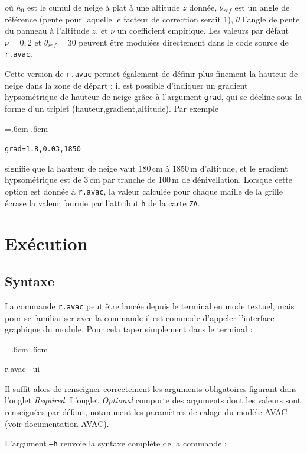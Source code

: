 \documentclass[12pt,oneside]{paper}
\newenvironment{code}{%
\vspace{2mm}%
\hangindent=.6cm%
\parindent.6cm%
\ttfamily%
\color{gris.3}%
}{
\vspace{2mm}%
}
\begin{document}
où $h_0$ est le cumul de neige à plat à une altitude $z$ donnée, $\theta_{ref}$ est un angle de référence (pente pour laquelle le facteur de correction serait 1),   $\theta$ l'angle de pente du panneau à l'altitude $z$, et $\nu$ un coefficient empirique. Les valeurs par défaut $\nu=0,2$ et $\theta_{ref}=30$\degres{} peuvent être modulées directement dans le code source de \verb+r.avac+.


Cette version de \verb+r.avac+ permet également de définir plus finement la hauteur de neige dans la zone de départ : il est possible d'indiquer un gradient hypsométrique de hauteur de neige grâce à l'argument \texttt{grad}, qui se décline sous la forme d'un triplet (hauteur,gradient,altitude). Par exemple

\begin{code}
\texttt{grad=1.8,0.03,1850} 
\end{code}

signifie que la hauteur de neige vaut 180\,cm à 1850\,m d'altitude, et le gradient hypsométrique est de 3\,cm par tranche de 100\,m de dénivellation. Lorsque cette option est donnée à \verb+r.avac+, la valeur calculée pour chaque maille de la grille écrase la valeur fournie par l'attribut \texttt{h} de la carte \texttt{ZA}.



\section{Exécution}

\subsection{Syntaxe}
La commande \verb+r.avac+ peut être lancée depuis le terminal en mode textuel, mais pour se familiariser avec la commande il est commode d'appeler l'interface graphique du module. Pour cela taper simplement dans le terminal :

\begin{code}
r.avac --ui
\end{code}

Il suffit alors de renseigner correctement les arguments obligatoires figurant dans l'onglet \emph{Required}. L'onglet \emph{Optional} comporte des arguments dont les valeurs sont renseignées par défaut, notamment les paramètres de calage du modèle AVAC (voir documentation AVAC).

\clearpage
L'argument \texttt{--h} renvoie la syntaxe complète de la commande :
\end{document}
